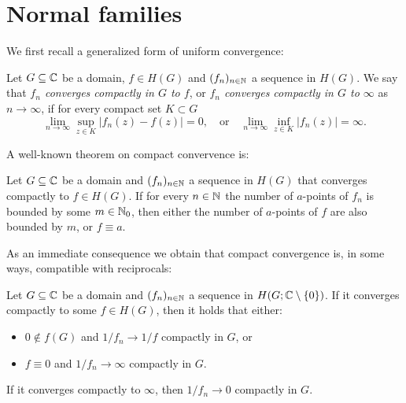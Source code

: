 \section{Normal families}
\label{sec:normal-families}

We first recall a generalized form of uniform convergence:

\begin{definition}
    Let $G \subseteq \mathbb{C}$ be a domain, $f \in H(G)$ and $(f_n)_{n \in \mathbb{N}}$ a sequence in $H(G)$. We say that \emph{$f_n$ converges compactly in $G$ to $f$}, or \emph{$f_n$ converges compactly in $G$ to $\infty$} as $n \to \infty$, if for every compact set $K \subset G$
    $$ \lim_{n \to \infty} \sup_{z \in K} \vert f_n(z) - f(z) \vert = 0, \quad \textrm{or} \quad \lim_{n \to \infty} \inf_{z \in K} \vert f_n(z) \vert = \infty. $$
\end{definition}


A well-known theorem on compact convervence is:

\begin{theorem}[Hurwitz] \label{thm:hurwitz}
    Let $G \subseteq \mathbb{C}$ be a domain and $(f_n)_{n \in \mathbb{N}}$ a sequence in $H(G)$ that converges compactly to $f \in H(G)$. If for every $n \in \mathbb{N}$ the number of $a$-points of $f_n$ is bounded by some $m \in \mathbb{N}_0$, then either the number of $a$-points of $f$ are also bounded by $m$, or $f \equiv a$.
\end{theorem}

As an immediate consequence we obtain that compact convergence is, in some ways, compatible with reciprocals:

\begin{lemma} \label{lem:compact-convergence-reciprocals}
Let $G \subseteq \mathbb{C}$ be a domain and $(f_n)_{n \in \mathbb{N}}$ a sequence in $H(G; \mathbb{C} \setminus \{ 0 \})$. If it converges compactly to some $f \in H(G)$, then it holds that either:
\begin{itemize}
    \item $0 \notin f(G)$ and $1 / f_n \to 1 / f$ compactly in $G$, or
    \item $f \equiv 0$ and $1 / f_n \to \infty$ compactly in $G$.
\end{itemize}
If it converges compactly to $\infty$, then $1 / f_n \to 0$ compactly in $G$.
\end{lemma}

